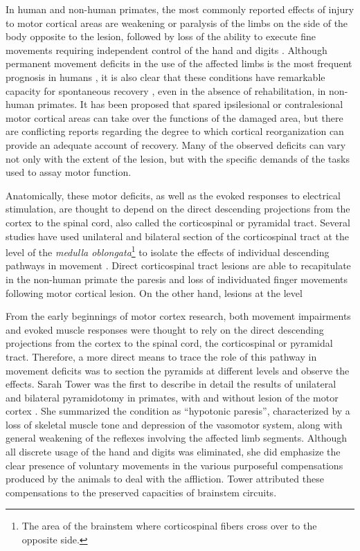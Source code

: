 In human and non-human primates, the most commonly reported effects of injury to motor cortical areas are weakening or paralysis of the limbs on the side of the body opposite to the lesion, followed by loss of the ability to execute fine movements requiring independent control of the hand and digits \cite{Ferrier1884,Lashley1924,Glees1950,Darling2011,Xu2015}. Although permanent movement deficits in the use of the affected limbs is the most frequent prognosis in humans \cite{Kwakkel2003}, it is also clear that these conditions have remarkable capacity for spontaneous recovery \cite{GrahamBrown1913,Leyton1917}, even in the absence of rehabilitation, in non-human primates. It has been proposed that spared ipsilesional or contralesional motor cortical areas can take over the functions of the damaged area, but there are conflicting reports regarding the degree to which cortical reorganization can provide an adequate account of recovery. Many of the observed deficits can vary not only with the extent of the lesion, but with the specific demands of the tasks used to assay motor function.

Anatomically, these motor deficits, as well as the evoked responses to electrical stimulation, are thought to depend on the direct descending projections from the cortex to the spinal cord, also called the corticospinal or pyramidal tract. Several studies have used unilateral and bilateral section of the corticospinal tract at the level of the \textit{medulla oblongata}\footnote{The area of the brainstem where corticospinal fibers cross over to the opposite side.} to isolate the effects of individual descending pathways in movement \cite{Tower1940,Lawrence1968,Lawrence1968a}. Direct corticospinal tract lesions are able to recapitulate in the non-human primate the paresis and loss of individuated finger movements following motor cortical lesion. On the other hand, lesions at the level 

From the early beginnings of motor cortex research, both movement impairments and evoked muscle responses were thought to rely on the direct descending projections from the cortex to the spinal cord, the corticospinal or pyramidal tract. Therefore, a more direct means to trace the role of this pathway in movement deficits was to section the pyramids at different levels and observe the effects. Sarah Tower was the first to describe in detail the results of unilateral and bilateral pyramidotomy in primates, with and without lesion of the motor cortex \cite{Tower1940}. She summarized the condition as ``hypotonic paresis'', characterized by a loss of skeletal muscle tone and depression of the vasomotor system, along with general weakening of the reflexes involving the affected limb segments. Although all discrete usage of the hand and digits was eliminated, she did emphasize the clear presence of voluntary movements in the various purposeful compensations produced by the animals to deal with the affliction. Tower attributed these compensations to the preserved capacities of brainstem circuits.

